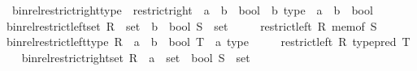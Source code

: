\begin{isabellebody}
\ \ bin{\isacharunderscore}{\kern0pt}rel{\isacharunderscore}{\kern0pt}restrict{\isacharunderscore}{\kern0pt}right{\isacharunderscore}{\kern0pt}type\ {\isasymequiv}\ {\isachardoublequoteopen}restrict{\isacharunderscore}{\kern0pt}right\ {\isacharcolon}{\kern0pt}{\isacharcolon}{\kern0pt}\ {\isacharparenleft}{\kern0pt}{\isacharprime}{\kern0pt}a\ {\isasymRightarrow}\ {\isacharprime}{\kern0pt}b\ {\isasymRightarrow}\ bool{\isacharparenright}{\kern0pt}\ {\isasymRightarrow}\ {\isacharprime}{\kern0pt}b\ type\ {\isasymRightarrow}\ {\isacharprime}{\kern0pt}a\ {\isasymRightarrow}\ {\isacharprime}{\kern0pt}b\ {\isasymRightarrow}\ bool{\isachardoublequoteclose}\isanewline
{}\isanewline
\ \ \isamarkupfalse%
\ {\isachardoublequoteopen}bin{\isacharunderscore}{\kern0pt}rel{\isacharunderscore}{\kern0pt}restrict{\isacharunderscore}{\kern0pt}left{\isacharunderscore}{\kern0pt}set\ {\isacharparenleft}{\kern0pt}R\ {\isacharcolon}{\kern0pt}{\isacharcolon}{\kern0pt}\ set\ {\isasymRightarrow}\ {\isacharprime}{\kern0pt}b\ {\isasymRightarrow}\ bool{\isacharparenright}{\kern0pt}\ {\isacharparenleft}{\kern0pt}S\ {\isacharcolon}{\kern0pt}{\isacharcolon}{\kern0pt}\ set{\isacharparenright}{\kern0pt}\ {\isasymequiv}\isanewline
\ \ \ \ restrict{\isacharunderscore}{\kern0pt}left\ R\ {\isacharparenleft}{\kern0pt}mem{\isacharunderscore}{\kern0pt}of\ S{\isacharparenright}{\kern0pt}{\isachardoublequoteclose}\isanewline
\ \ \isamarkupfalse%
\ {\isachardoublequoteopen}bin{\isacharunderscore}{\kern0pt}rel{\isacharunderscore}{\kern0pt}restrict{\isacharunderscore}{\kern0pt}left{\isacharunderscore}{\kern0pt}type\ {\isacharparenleft}{\kern0pt}R\ {\isacharcolon}{\kern0pt}{\isacharcolon}{\kern0pt}\ {\isacharprime}{\kern0pt}a\ {\isasymRightarrow}\ {\isacharprime}{\kern0pt}b\ {\isasymRightarrow}\ bool{\isacharparenright}{\kern0pt}\ {\isacharparenleft}{\kern0pt}T\ {\isacharcolon}{\kern0pt}{\isacharcolon}{\kern0pt}\ {\isacharprime}{\kern0pt}a\ type{\isacharparenright}{\kern0pt}\ {\isasymequiv}\isanewline
\ \ \ \ restrict{\isacharunderscore}{\kern0pt}left\ R\ {\isacharparenleft}{\kern0pt}type{\isacharunderscore}{\kern0pt}pred\ T{\isacharparenright}{\kern0pt}{\isachardoublequoteclose}\isanewline
\ \ \isamarkupfalse%
\ {\isachardoublequoteopen}bin{\isacharunderscore}{\kern0pt}rel{\isacharunderscore}{\kern0pt}restrict{\isacharunderscore}{\kern0pt}right{\isacharunderscore}{\kern0pt}set\ {\isacharparenleft}{\kern0pt}R\ {\isacharcolon}{\kern0pt}{\isacharcolon}{\kern0pt}\ {\isacharprime}{\kern0pt}a\ {\isasymRightarrow}\ set\ {\isasymRightarrow}\ bool{\isacharparenright}{\kern0pt}\ {\isacharparenleft}{\kern0pt}S\ {\isacharcolon}{\kern0pt}{\isacharcolon}{\kern0pt}\ set{\isacharparenright}{\kern0pt}\ {\isasymequiv}\isanewline

\end{isabellebody}
